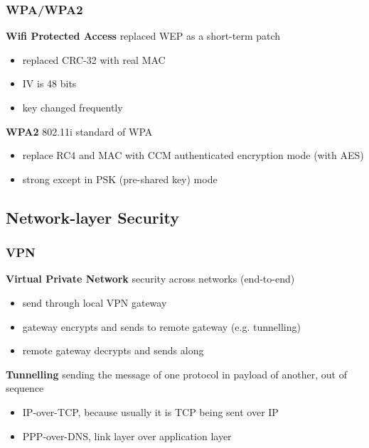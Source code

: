 \documentclass[]{article}
\theoremstyle{definition}
\begin{document}
	\subsubsection{WPA/WPA2}
	\textbf{Wifi Protected Access} replaced WEP as a short-term patch
	\begin{itemize}
		\item replaced CRC-32 with real MAC
		\item IV is 48 bits 
		\item key changed frequently
	\end{itemize}
	\textbf{WPA2} 802.11i standard of WPA
	\begin{itemize}
		\item replace RC4 and MAC with CCM authenticated encryption mode (with AES)
		\item strong except in PSK (pre-shared key) mode
	\end{itemize}

	\subsection{Network-layer Security}
	\subsubsection{VPN}
	\textbf{Virtual Private Network} security across networks (end-to-end)
	\begin{itemize}
		\item send through local VPN gateway
		\item gateway encrypts and sends to remote gateway (e.g. tunnelling)
		\item remote gateway decrypts and sends along
	\end{itemize}
	\textbf{Tunnelling} sending the message of one protocol in payload of another, out of sequence
	\begin{itemize}
		\item IP-over-TCP, because usually it is TCP being sent over IP
		\item PPP-over-DNS, link layer over application layer
	\end{itemize}
\end{document}
